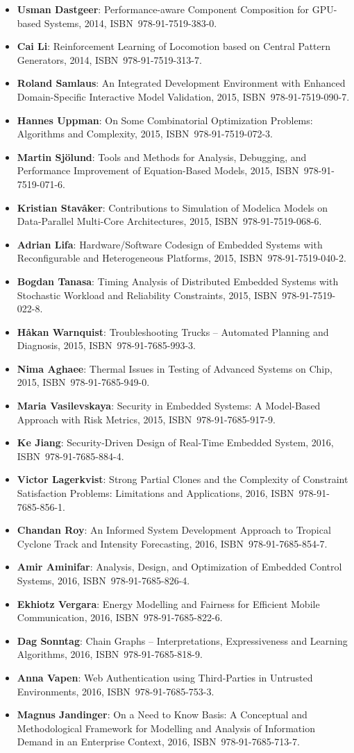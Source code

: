 \documentclass[a4paper,showtrims,twocolumn]{memoir}
\newenvironment{theses}{
  \begin{itemize}
    \setlength{\itemsep}{0.2em}
    \setlength{\parskip}{0em}
    \setlength{\parsep}{0em}
}{
  \end{itemize}
}
\newcommand{\thesis}[5]{\item[No. #1] \textbf{#2}: #3, #4, ISBN~#5.}
\begin{document}
\begin{theses}
    \thesis{1581}{Usman Dastgeer}{Performance-aware Component Composition for GPU-based Systems}{2014}{978-91-7519-383-0}
    \thesis{1602}{Cai Li}{Reinforcement Learning of Locomotion based on Central Pattern Generators}{2014}{978-91-7519-313-7}
    \thesis{1652}{Roland Samlaus}{An Integrated Development Environment with Enhanced Domain-Specific Interactive Model Validation}{2015}{978-91-7519-090-7}
    \thesis{1663}{Hannes Uppman}{On Some Combinatorial Optimization Problems: Algorithms and Complexity}{2015}{978-91-7519-072-3}
    \thesis{1664}{Martin Sjölund}{Tools and Methods for Analysis, Debugging, and Performance Improvement of Equation-Based Models}{2015}{978-91-7519-071-6}
    \thesis{1666}{Kristian Stavåker}{Contributions to Simulation of Modelica Models on Data-Parallel Multi-Core Architectures}{2015}{978-91-7519-068-6}
    \thesis{1680}{Adrian Lifa}{Hardware/Software Codesign of Embedded Systems with Reconfigurable and Heterogeneous Platforms}{2015}{978-91-7519-040-2}
    \thesis{1685}{Bogdan Tanasa}{Timing Analysis of Distributed Embedded Systems with Stochastic Workload and Reliability Constraints}{2015}{978-91-7519-022-8}
    \thesis{1691}{Håkan Warnquist}{Troubleshooting Trucks – Automated Planning and Diagnosis}{2015}{978-91-7685-993-3}
    \thesis{1702}{Nima Aghaee}{Thermal Issues in Testing of Advanced Systems on Chip}{2015}{978-91-7685-949-0}
    \thesis{1715}{Maria Vasilevskaya}{Security in Embedded Systems: A Model-Based Approach with Risk Metrics}{2015}{978-91-7685-917-9}
    \thesis{1729}{Ke Jiang}{Security-Driven Design of Real-Time Embedded System}{2016}{978-91-7685-884-4}
    \thesis{1733}{Victor Lagerkvist}{Strong Partial Clones and the Complexity of Constraint Satisfaction Problems: Limitations and Applications}{2016}{978-91-7685-856-1}
    \thesis{1734}{Chandan Roy}{An Informed System Development Approach to Tropical Cyclone Track and Intensity Forecasting}{2016}{978-91-7685-854-7}
    \thesis{1746}{Amir Aminifar}{Analysis, Design, and Optimization of Embedded Control Systems}{2016}{978-91-7685-826-4}
    \thesis{1747}{Ekhiotz Vergara}{Energy Modelling and Fairness for Efficient Mobile Communication}{2016}{978-91-7685-822-6}
    \thesis{1748}{Dag Sonntag}{Chain Graphs – Interpretations, Expressiveness and Learning Algorithms}{2016}{978-91-7685-818-9}
    \thesis{1768}{Anna Vapen}{Web Authentication using Third-Parties in Untrusted Environments}{2016}{978-91-7685-753-3}
    \thesis{1778}{Magnus Jandinger}{On a Need to Know Basis: A Conceptual and Methodological Framework for Modelling and Analysis of Information Demand in an Enterprise Context}{2016}{978-91-7685-713-7}

\end{theses}
\end{document}

